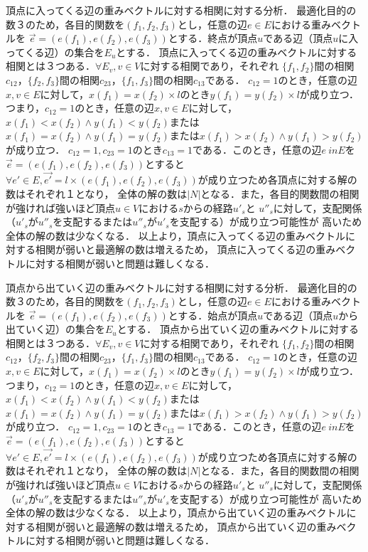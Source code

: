\documentclass[12pt]{optlab-bachelor}
\begin{document}
頂点に入ってくる辺の重みベクトルに対する相関に対する分析．
最適化目的の数３のため，各目的関数を$(f_1,f_2,f_3)$とし，任意の辺$e　\in E$における重みベクトルを
$\vec{e}=(e(f_1),e(f_2),e(f_3))$とする．終点が頂点$u$である辺（頂点$u$に入ってくる辺）の集合を$E_u$とする．
頂点に入ってくる辺の重みベクトルに対する相関とは３つある．$\forall E_v , v \in V$に対する相関であり，それぞれ
$\{f_1,f_2\}$間の相関$c_{12}$，$\{f_2,f_3\}$間の相関$c_{23}$，$\{f_1,f_3\}$間の相関$c_{13}$である．
$c_{12}=1$のとき，任意の辺$x,v\in E$に対して，$x(f_1)=x(f_2)\times l$のとき$y(f_1)=y(f_2)\times l$が成り立つ．
つまり，$c_{12}=1$のとき，任意の辺$x,v\in E$に対して，$x(f_1)<x(f_2) \land y(f_1)<y(f_2)$または
$x(f_1)=x(f_2) \land y(f_1)=y(f_2)$または$x(f_1)>x(f_2) \land y(f_1)>y(f_2)$が成り立つ．
$c_{12}=1,c_{23}=1$のとき$c_{13}=1$である．このとき，任意の辺$e \ inE$を$\vec{e}=(e(f_1),e(f_2),e(f_3))$とすると
$\forall e'\in E,\vec{e'} = l\times(e(f_1),e(f_2),e(f_3))$が成り立つため各頂点に対する解の数はそれぞれ１となり，
全体の解の数は$|N|$となる．また，各目的関数間の相関が強ければ強いほど頂点$u\in V$における$s$からの経路$u'_{s}$と
$u''_{s}$に対して，支配関係（$u'_{s}$が$u''_{s}$を支配するまたは$u''_{s}$が$u'_{s}$を支配する）が成り立つ可能性が
高いため全体の解の数は少なくなる．
以上より，頂点に入ってくる辺の重みベクトルに対する相関が弱いと最適解の数は増えるため，
頂点に入ってくる辺の重みベクトルに対する相関が弱いと問題は難しくなる．


頂点から出ていく辺の重みベクトルに対する相関に対する分析．
最適化目的の数３のため，各目的関数を$(f_1,f_2,f_3)$とし，任意の辺$e　\in E$における重みベクトルを
$\vec{e}=(e(f_1),e(f_2),e(f_3))$とする．始点が頂点$u$である辺（頂点$u$から出ていく辺）の集合を$E_u$とする．
頂点から出ていく辺の重みベクトルに対する相関とは３つある．$\forall E_v , v \in V$に対する相関であり，それぞれ
$\{f_1,f_2\}$間の相関$c_{12}$，$\{f_2,f_3\}$間の相関$c_{23}$，$\{f_1,f_3\}$間の相関$c_{13}$である．
$c_{12}=1$のとき，任意の辺$x,v\in E$に対して，$x(f_1)=x(f_2)\times l$のとき$y(f_1)=y(f_2)\times l$が成り立つ．
つまり，$c_{12}=1$のとき，任意の辺$x,v\in E$に対して，$x(f_1)<x(f_2) \land y(f_1)<y(f_2)$または
$x(f_1)=x(f_2) \land y(f_1)=y(f_2)$または$x(f_1)>x(f_2) \land y(f_1)>y(f_2)$が成り立つ．
$c_{12}=1,c_{23}=1$のとき$c_{13}=1$である．このとき，任意の辺$e \ inE$を$\vec{e}=(e(f_1),e(f_2),e(f_3))$とすると
$\forall e'\in E,\vec{e'} = l\times(e(f_1),e(f_2),e(f_3))$が成り立つため各頂点に対する解の数はそれぞれ１となり，
全体の解の数は$|N|$となる．また，各目的関数間の相関が強ければ強いほど頂点$u\in V$における$s$からの経路$u'_{s}$と
$u''_{s}$に対して，支配関係（$u'_{s}$が$u''_{s}$を支配するまたは$u''_{s}$が$u'_{s}$を支配する）が成り立つ可能性が
高いため全体の解の数は少なくなる．
以上より，頂点から出ていく辺の重みベクトルに対する相関が弱いと最適解の数は増えるため，
頂点から出ていく辺の重みベクトルに対する相関が弱いと問題は難しくなる．
\end{document}
